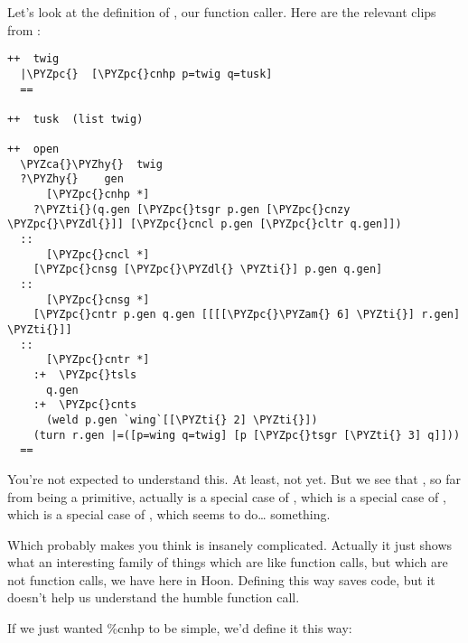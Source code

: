Let's look at the definition of , our function caller.
Here are the relevant clips from :

\begin{framed_shaded}
\begin{Verbatim}[fontsize=\relsize{-2.5},fontseries=b,commandchars=\\\{\}]
++  twig
  |\PYZpc{}  [\PYZpc{}cnhp p=twig q=tusk]
  ==

++  tusk  (list twig)

++  open
  \PYZca{}\PYZhy{}  twig
  ?\PYZhy{}    gen
      [\PYZpc{}cnhp *]
    ?\PYZti{}(q.gen [\PYZpc{}tsgr p.gen [\PYZpc{}cnzy \PYZpc{}\PYZdl{}]] [\PYZpc{}cncl p.gen [\PYZpc{}cltr q.gen]])
  ::
      [\PYZpc{}cncl *]  
    [\PYZpc{}cnsg [\PYZpc{}\PYZdl{} \PYZti{}] p.gen q.gen]
  ::
      [\PYZpc{}cnsg *]  
    [\PYZpc{}cntr p.gen q.gen [[[[\PYZpc{}\PYZam{} 6] \PYZti{}] r.gen] \PYZti{}]]
  ::
      [\PYZpc{}cntr *]
    :+  \PYZpc{}tsls
      q.gen
    :+  \PYZpc{}cnts
      (weld p.gen `wing`[[\PYZti{} 2] \PYZti{}])
    (turn r.gen |=([p=wing q=twig] [p [\PYZpc{}tsgr [\PYZti{} 3] q]]))
  ==
\end{Verbatim}
\end{framed_shaded}
You're not expected to understand this.  At least, not yet.  But
we see that \kode{\%-}, so far from being a primitive, actually is a
special case of \kode{\%:}, which is a special case of \kode{\%\sig }, which is a
special case of \kode{\%*}, which seems to do\ldots{} something.

Which probably makes you think  is insanely complicated.
Actually it just shows what an interesting family of things
which are like function calls, but which are not function calls,
we have here in Hoon.  Defining  this way saves code, but
it doesn't help us understand the humble function call.

If we just wanted \%cnhp to be simple, we'd define it this way:

